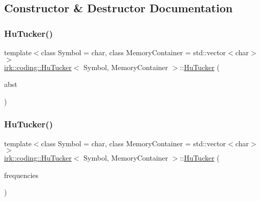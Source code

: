 \subsection{Constructor \& Destructor Documentation}
\mbox{\label{classirk_1_1coding_1_1HuTucker_adb12746133da5891e437ef4430caaf45}} 
\subsubsection{\texorpdfstring{Hu\+Tucker()}{HuTucker()}\hspace{0.1cm}{\footnotesize\ttfamily [1/2]}}
{\footnotesize\ttfamily template$<$class Symbol  = char, class Memory\+Container  = std\+::vector$<$char$>$$>$ \\
\mbox{\hyperlink{classirk_1_1coding_1_1HuTucker}{irk\+::coding\+::\+Hu\+Tucker}}$<$ Symbol, Memory\+Container $>$\+::\mbox{\hyperlink{classirk_1_1coding_1_1HuTucker}{Hu\+Tucker}} (\begin{DoxyParamCaption}\item[{io\+::\+Compact\+A\+B\+ST$<$ Symbol, uint16\+\_\+t, Memory\+Container $>$}]{abst }\end{DoxyParamCaption})\hspace{0.3cm}{\ttfamily [inline]}}

\mbox{\label{classirk_1_1coding_1_1HuTucker_a037c234fff77b8a40494acbab9cd1475}} 
\subsubsection{\texorpdfstring{Hu\+Tucker()}{HuTucker()}\hspace{0.1cm}{\footnotesize\ttfamily [2/2]}}
{\footnotesize\ttfamily template$<$class Symbol  = char, class Memory\+Container  = std\+::vector$<$char$>$$>$ \\
\mbox{\hyperlink{classirk_1_1coding_1_1HuTucker}{irk\+::coding\+::\+Hu\+Tucker}}$<$ Symbol, Memory\+Container $>$\+::\mbox{\hyperlink{classirk_1_1coding_1_1HuTucker}{Hu\+Tucker}} (\begin{DoxyParamCaption}\item[{const std\+::vector$<$ std\+::size\+\_\+t $>$ \&}]{frequencies }\end{DoxyParamCaption})\hspace{0.3cm}{\ttfamily [inline]}}



